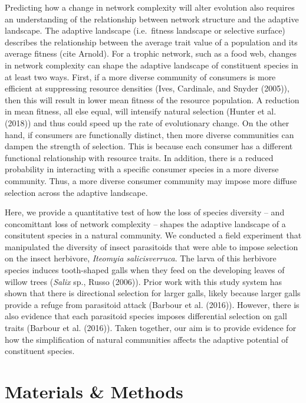 \documentclass[]{elsarticle} %
\begin{document}
Predicting how a change in network complexity will alter evolution also
requires an understanding of the relationship between network structure
and the adaptive landscape. The adaptive landscape (i.e.~fitness
landscape or selective surface) describes the relationship between the
average trait value of a population and its average fitness (cite
Arnold). For a trophic network, such as a food web, changes in network
complexity can shape the adaptive landscape of constituent species in at
least two ways. First, if a more diverse community of consumers is more
efficient at suppressing resource densities (Ives, Cardinale, and Snyder
(2005)), then this will result in lower mean fitness of the resource
population. A reduction in mean fitness, all else equal, will intensify
natural selection (Hunter et al. (2018)) and thus could speed up the
rate of evolutionary change. On the other hand, if consumers are
functionally distinct, then more diverse communities can dampen the
strength of selection. This is because each consumer has a different
functional relationship with resource traits. In addition, there is a
reduced probability in interacting with a specific consumer species in a
more diverse community. Thus, a more diverse consumer community may
impose more diffuse selection across the adaptive landscape.

Here, we provide a quantitative test of how the loss of species
diversity -- and concomittant loss of network complexity -- shapes the
adaptive landscape of a consitutent species in a natural community. We
conducted a field experiment that manipulated the diversity of insect
parasitoids that were able to impose selection on the insect herbivore,
\emph{Iteomyia salicisverruca}. The larva of this herbivore species
induces tooth-shaped galls when they feed on the developing leaves of
willow trees (\emph{Salix} sp., Russo (2006)). Prior work with this
study system has shown that there is directional selection for larger
galls, likely because larger galls provide a refuge from parasitoid
attack (Barbour et al. (2016)). However, there is also evidence that
each parasitoid species imposes differential selection on gall traits
(Barbour et al. (2016)). Taken together, our aim is to provide evidence
for how the simplification of natural communities affects the adaptive
potential of constituent species.

\section{Materials \& Methods}\label{materials-methods}
\end{document}
